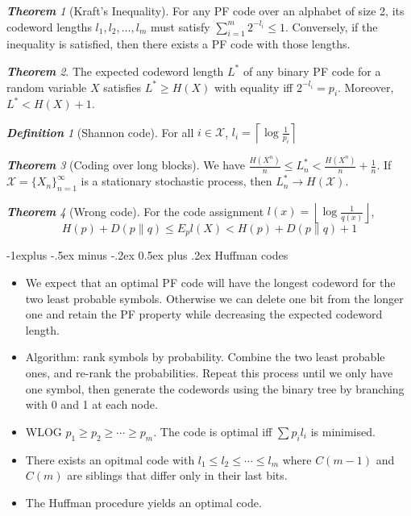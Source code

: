 \documentclass[frenchspacing,9pt,landscape,a4paper]{article}
\makeatletter
\renewcommand{\subsection}{\@startsection{subsection}{2}{0mm}%
                                {-1explus -.5ex minus -.2ex}%
                                {0.5ex plus .2ex}%
                                {\normalfont\normalsize\bfseries}}
\newcommand{\floor}[1]{\left\lfloor #1 \right\rfloor}
\newcommand{\ceiling}[1]{\left\lceil #1 \right\rceil}
\theoremstyle{remark}
\newtheorem*{thm}{\textbf{Theorem}}
\newtheorem*{defn}{\textbf{Definition}}
\makeatother
\begin{document}
\begin{multicols}{4}
\begin{thm}[Kraft's Inequality]
    For any PF code over an alphabet of size 2, its codeword lengths  $l_1,l_2,\dots,l_m$ must satisfy
    $\sum_{i=1}^m 2^{-l_i}\leq 1$. Conversely, if the inequality is satisfied, then there exists a PF code
    with those lengths.
\end{thm}
\begin{thm}
    The expected codeword length $L^*$ of any binary PF code for a random variable  $X$ satisfies  $L^*\geq
    H(X)$ with equality iff  $2^{-l_i}=p_i$. Moreover, $L^*<H(X)+1$.
\end{thm}
\begin{defn}[Shannon code]
    For all  $i\in\mathcal{X}$, $l_i=\ceiling{\log \frac{1}{p_i}}$
\end{defn}
\begin{thm}[Coding over long blocks]
    We have $\frac{H(X^n)}{n}\leq L_n^*<\frac{H(X^n)}{n}+\frac{1}{n}$. If
    $\mathcal{X}=\{X_n\}_{n=1}^\infty$ is a stationary stochastic process, then $L_n^*\to H(\mathcal{X})$.
\end{thm}
\begin{thm}[Wrong code]
    For the code assignment $l(x)=\floor{\log \frac{1}{q(x)}}$, \[H(p)+D(p\parallel q)\leq E_p
    l(X)<H(p)+D(p\parallel q)+1\]
\end{thm}
\subsection{Huffman codes}
\begin{itemize}
    \item We expect that an optimal PF code will have the longest codeword for the two least probable
        symbols. Otherwise we can delete one bit from the longer one and retain the PF property while
        decreasing the expected codeword length.
    \item Algorithm: rank symbols by probability. Combine the two least probable ones, and re-rank the
        probabilities. Repeat this process until we only have one symbol, then generate the codewords using
        the binary tree by branching with 0 and 1 at each node.
    \item WLOG $p_1\geq p_2\geq\cdots\geq p_m$. The code is optimal iff $\sum p_il_i$ is minimised.
    \item There exists an opitmal code with $l_1\leq l_2\leq\cdots\leq l_m$ where $C(m-1)$ and $C(m)$ are
        siblings that differ only in their last bits.
    \item The Huffman procedure yields an optimal code.
\end{itemize}

\end{multicols}
\end{document}

